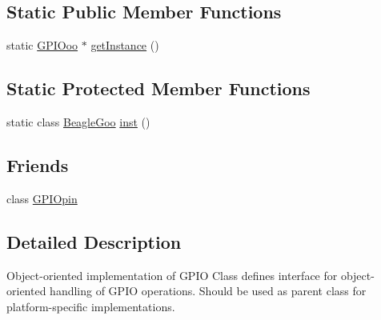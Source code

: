 \subsection*{Static Public Member Functions}
\begin{DoxyCompactItemize}
\item 
static \hyperlink{class_g_p_i_ooo}{G\-P\-I\-Ooo} $\ast$ \hyperlink{class_g_p_i_ooo_a6bbf91045352182749934096c3f4c42d}{get\-Instance} ()
\end{DoxyCompactItemize}
\subsection*{Static Protected Member Functions}
\begin{DoxyCompactItemize}
\item 
static class \hyperlink{struct_beagle_goo}{Beagle\-Goo} \hyperlink{class_g_p_i_ooo_a8b49cf33628e0cb0e77c534ad971eef9}{inst} ()
\end{DoxyCompactItemize}
\subsection*{Friends}
\begin{DoxyCompactItemize}
\item 
class \hyperlink{class_g_p_i_ooo_a266ea875ace024757dd1209ea5c0a327}{G\-P\-I\-Opin}
\end{DoxyCompactItemize}


\subsection{Detailed Description}
Object-\/oriented implementation of G\-P\-I\-O Class defines interface for object-\/oriented handling of G\-P\-I\-O operations. Should be used as parent class for platform-\/specific implementations. 

